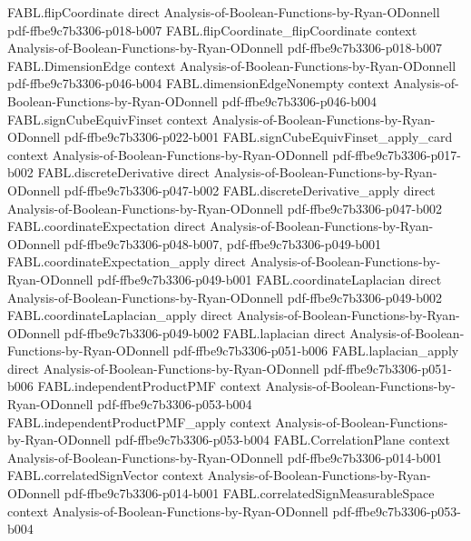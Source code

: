 \begin{theorem}
\proofstep
  {FABL.flipCoordinate}
  {direct}
  {Analysis-of-Boolean-Functions-by-Ryan-ODonnell}
  {pdf-ffbe9c7b3306-p018-b007}
\proofstep
  {FABL.flipCoordinate_flipCoordinate}
  {context}
  {Analysis-of-Boolean-Functions-by-Ryan-ODonnell}
  {pdf-ffbe9c7b3306-p018-b007}
\proofstep
  {FABL.DimensionEdge}
  {context}
  {Analysis-of-Boolean-Functions-by-Ryan-ODonnell}
  {pdf-ffbe9c7b3306-p046-b004}
\proofstep
  {FABL.dimensionEdgeNonempty}
  {context}
  {Analysis-of-Boolean-Functions-by-Ryan-ODonnell}
  {pdf-ffbe9c7b3306-p046-b004}
\proofstep
  {FABL.signCubeEquivFinset}
  {context}
  {Analysis-of-Boolean-Functions-by-Ryan-ODonnell}
  {pdf-ffbe9c7b3306-p022-b001}
\proofstep
  {FABL.signCubeEquivFinset_apply_card}
  {context}
  {Analysis-of-Boolean-Functions-by-Ryan-ODonnell}
  {pdf-ffbe9c7b3306-p017-b002}
\proofstep
  {FABL.discreteDerivative}
  {direct}
  {Analysis-of-Boolean-Functions-by-Ryan-ODonnell}
  {pdf-ffbe9c7b3306-p047-b002}
\proofstep
  {FABL.discreteDerivative_apply}
  {direct}
  {Analysis-of-Boolean-Functions-by-Ryan-ODonnell}
  {pdf-ffbe9c7b3306-p047-b002}
\proofstep
  {FABL.coordinateExpectation}
  {direct}
  {Analysis-of-Boolean-Functions-by-Ryan-ODonnell}
  {pdf-ffbe9c7b3306-p048-b007,
    pdf-ffbe9c7b3306-p049-b001}
\proofstep
  {FABL.coordinateExpectation_apply}
  {direct}
  {Analysis-of-Boolean-Functions-by-Ryan-ODonnell}
  {pdf-ffbe9c7b3306-p049-b001}
\proofstep
  {FABL.coordinateLaplacian}
  {direct}
  {Analysis-of-Boolean-Functions-by-Ryan-ODonnell}
  {pdf-ffbe9c7b3306-p049-b002}
\proofstep
  {FABL.coordinateLaplacian_apply}
  {direct}
  {Analysis-of-Boolean-Functions-by-Ryan-ODonnell}
  {pdf-ffbe9c7b3306-p049-b002}
\proofstep
  {FABL.laplacian}
  {direct}
  {Analysis-of-Boolean-Functions-by-Ryan-ODonnell}
  {pdf-ffbe9c7b3306-p051-b006}
\proofstep
  {FABL.laplacian_apply}
  {direct}
  {Analysis-of-Boolean-Functions-by-Ryan-ODonnell}
  {pdf-ffbe9c7b3306-p051-b006}
\proofstep
  {FABL.independentProductPMF}
  {context}
  {Analysis-of-Boolean-Functions-by-Ryan-ODonnell}
  {pdf-ffbe9c7b3306-p053-b004}
\proofstep
  {FABL.independentProductPMF_apply}
  {context}
  {Analysis-of-Boolean-Functions-by-Ryan-ODonnell}
  {pdf-ffbe9c7b3306-p053-b004}
\proofstep
  {FABL.CorrelationPlane}
  {context}
  {Analysis-of-Boolean-Functions-by-Ryan-ODonnell}
  {pdf-ffbe9c7b3306-p014-b001}
\proofstep
  {FABL.correlatedSignVector}
  {context}
  {Analysis-of-Boolean-Functions-by-Ryan-ODonnell}
  {pdf-ffbe9c7b3306-p014-b001}
\proofstep
  {FABL.correlatedSignMeasurableSpace}
  {context}
  {Analysis-of-Boolean-Functions-by-Ryan-ODonnell}
  {pdf-ffbe9c7b3306-p053-b004}

\end{theorem}
